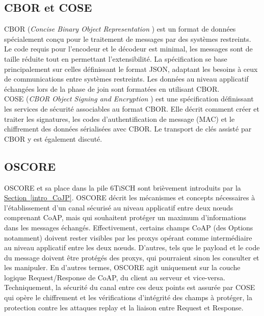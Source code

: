 \documentclass[]{report}
\newcommand{\wordlink}[2]{\hyperref[#2]{#1~\ref{#2}}}
\begin{document}
\subsection{CBOR et COSE}

CBOR (\textit{Concise Binary Object Representation} \cite{rfc7049}) est un format de données spécialement conçu pour le traitement de messages par des systèmes restreints. Le code requis pour l'encodeur et le décodeur est minimal, les messages sont de taille réduite tout en permettant l'extensibilité. La spécification se base principalement sur celles définissant le format JSON, adaptant les besoins à ceux de communications entre systèmes restreints. Les données au niveau applicatif échangées lors de la phase de join sont formatées en utilisant CBOR.\\

COSE (\textit{CBOR Object Signing and Encryption} \cite{rfc8152}) est une spécification définissant les services de sécurité associables au format CBOR. Elle décrit comment créer et traiter les signatures, les codes d'authentification de message (MAC) et le chiffrement des données sérialisées avec CBOR. Le transport de clés assisté par CBOR y est également discuté.

\subsection{OSCORE}

OSCORE \cite{rfc8613} et sa place dans la pile 6TiSCH sont brièvement introduits par la \wordlink{Section}{intro_CoJP}. OSCORE décrit les mécanismes et concepts nécessaires à l'établissement d'un canal sécurisé au niveau applicatif entre deux nœuds comprenant CoAP, mais qui souhaitent protéger un maximum d'informations dans les messages échangés. Effectivement, certains champs CoAP (des Options notamment) doivent rester visibles par les proxys opérant comme intermédiaire au niveau applicatif entre les deux nœuds. D'autres, tels que le payload et le code du message doivent être protégés des proxys, qui pourraient sinon les consulter et les manipuler. En d'autres termes, OSCORE agit uniquement sur la couche logique Request/Response de CoAP, du client au serveur et vice-versa. Techniquement, la sécurité du canal entre ces deux points est assurée par COSE qui opère le chiffrement et les vérifications d'intégrité des champs à protéger, la protection contre les attaques replay et la liaison entre Request et Response.\\
\end{document}
